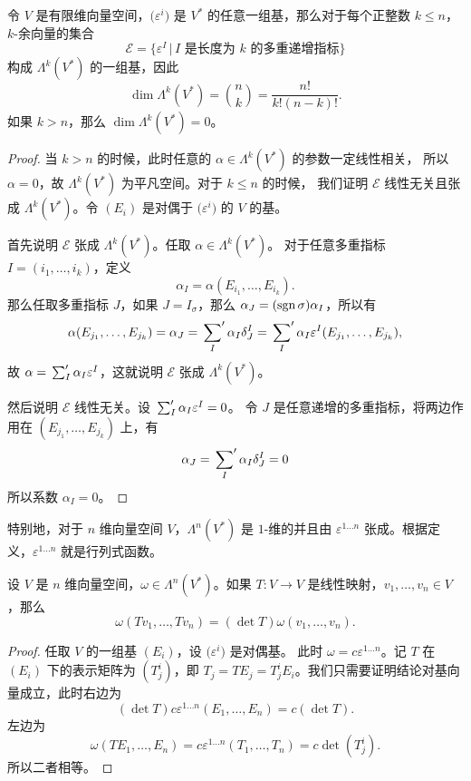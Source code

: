 \begin{proposition}\label{prop:basis of Lambda}
  令 $V$ 是有限维向量空间，$\bigl(\varepsilon^i\bigr)$ 是 $V^*$
  的任意一组基，那么对于每个正整数 $k\leq n$，$k$-余向量的集合
  \[
    \mathcal{E}=\bigl\{\varepsilon^I\,|\, \text{$I$ 是长度为 $k$ 的多重递增指标}\bigr\}  
  \]
  构成 $\Lambda^k(V^*)$ 的一组基，因此
  \[
    \dim\Lambda^k(V^*)=\binom{n}{k}=\frac{n!}{k!(n-k)!}.  
  \]
  如果 $k> n$，那么 $\dim\Lambda^k(V^*)=0$。
\end{proposition}
\begin{proof}
  当 $k>n$ 的时候，此时任意的 $\alpha\in \Lambda^k(V^*)$ 的参数一定线性相关，
  所以 $\alpha=0$，故 $\Lambda^k(V^*)$ 为平凡空间。对于 $k\le n$ 的时候，
  我们证明 $\mathcal{E}$ 线性无关且张成 $\Lambda^k(V^*)$。令 $(E_i)$
  是对偶于 $\bigl(\varepsilon^i\bigr)$ 的 $V$ 的基。

  首先说明 $\mathcal{E}$ 张成 $\Lambda^k(V^*)$。任取 $\alpha\in \Lambda^k(V^*)$。
  对于任意多重指标 $I=(i_1,\dots,i_k)$，定义
  \[
    \alpha_I=\alpha(E_{i_1},\dots,E_{i_k}).  
  \]
  那么任取多重指标 $J$，如果 $J=I_\sigma$，那么 $\alpha_J=(\operatorname{sgn}\sigma)\alpha_I$，所以有
  \[
    \alpha(E_{j_1},\dots,E_{j_k})=\alpha_J=\sideset{}{'}\sum_{I}\alpha_I\delta_J^I
    =  \sideset{}{'}\sum_I\alpha_I\varepsilon^I(E_{j_1},\dots,E_{j_k}),
  \]
  故 $\alpha=\sideset{}{'}{\textstyle\sum_I}\alpha_I\varepsilon^I$，这就说明  $\mathcal{E}$ 张成 $\Lambda^k(V^*)$。

  然后说明 $\mathcal{E}$ 线性无关。设 $\sideset{}{'}{\textstyle\sum_I}\alpha_I\varepsilon^I=0$。
  令 $J$ 是任意递增的多重指标，将两边作用在 $(E_{j_1},\dots,E_{j_k})$ 上，有
  \[
    \alpha_J=\sideset{}{'}\sum_I\alpha_I\delta_J^I=0  
  \]
  所以系数 $\alpha_I=0$。
\end{proof}

特别地，对于 $n$ 维向量空间 $V$，$\Lambda^n(V^*)$ 是 $1$-维的并且由
$\varepsilon^{1\dots n}$ 张成。根据定义，$\varepsilon^{1\dots n}$
就是行列式函数。

\begin{proposition}\label{prop:property of alt}
  设 $V$ 是 $n$ 维向量空间，$\omega\in \Lambda^n(V^*)$。如果 $T:V\to V$
  是线性映射，$v_1,\dots,v_n\in V$，那么
  \begin{equation}
    \omega(Tv_1,\dots,Tv_n)=(\det T)\omega(v_1,\dots,v_n).
  \end{equation}
\end{proposition}
\begin{proof}
  任取 $V$ 的一组基 $(E_i)$，设 $\bigl(\varepsilon^i\bigr)$ 是对偶基。
  此时 $\omega=c\varepsilon^{1\dots n}$。记 $T$ 在 $(E_i)$ 下的表示矩阵为
  $(T_j^i)$，即 $T_j=TE_j=T_j^iE_i$。我们只需要证明结论对基向量成立，此时右边为
  \[
    (\det T)c\varepsilon^{1\dots n}(E_1,\dots,E_n)=c(\det T).
  \]
  左边为
  \[
    \omega(TE_1,\dots,E_n)=c\varepsilon^{1\dots n}
    (T_1,\dots,T_n)=c\det (T_j^i).  
  \]
  所以二者相等。
\end{proof}

